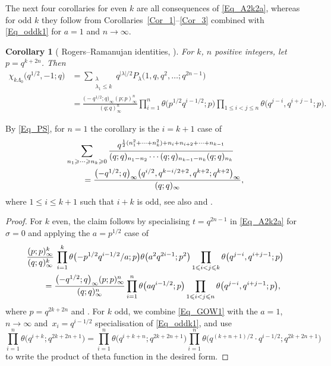\documentclass[pdftex]{sigma}
\numberwithin{equation}{section}
\newtheorem{Corollary}[Theorem]{Corollary}
\renewcommand{\leq}{\leqslant}
\renewcommand{\geq}{\geqslant}
\newcommand{\abs}[1]{\vert#1\vert}
\newcommand{\la}{\lambda}
\newcommand{\La}{\Lambda}
\begin{document}
The next four corollaries for even $k$ are all consequences of
\eqref{Eq_A2k2a}, whereas for odd $k$ they follow from
Corollaries~\ref{Cor_1}--\ref{Cor_3} combined with \eqref{Eq_oddk1}
for $a=1$ and $n\to\infty$.

\begin{Corollary}[ Rogers--Ramanujan identities,
{\cite[Theorem 5.14]{RW21}}]\label{Cor_4}
For $k$, $n$ positive integers, let $p=q^{k+2n}$.
Then
\begin{align*}
\chi_{k\La_0}\bigl(q^{1/2},-1;q\bigr)&=
\sum_{\substack{\la \\[1pt] \la_1\leq k}}
q^{\abs{\la}/2} P_{\la}\bigl(1,q,q^2,\dots;q^{2n-1}\bigr) \\
&=\frac{\bigl(-q^{1/2};q\bigr)_{\infty}(p;p)_{\infty}^n}{(q;q)_{\infty}^n}
\prod_{i=1}^n \theta\bigl(p^{1/2}q^{i-1/2};p\bigr)
\prod_{1\leq i<j\leq n} \theta\bigl(q^{j-i},q^{i+j-1};p\bigr).
\end{align*}
\end{Corollary}

By \eqref{Eq_PS}, for $n=1$ the corollary is the $i=k+1$ case of
\cite[Theorem 3]{Andrews10}
\begin{align}
&\sum_{n_1\geq\cdots\geq n_k\geq 0}
\frac{q^{\frac{1}{2}(n_1^2+\dots+n_k^2)+n_i+n_{i+2}+\dots+n_{k-1}}}
{(q;q)_{n_1-n_2}\cdots(q;q)_{n_{k-1}-n_k}(q;q)_{n_k}} \notag \\
&\qquad{}=\frac{\bigl(-q^{1/2};q\bigr)_{\infty}
\bigl(q^{i/2},q^{k-i/2+2},q^{k+2};q^{k+2}\bigr)_{\infty}}{(q;q)_{\infty}},
\label{Eq_Andrews10}
\end{align}
where $1\leq i\leq k+1$ such that $i+k$ is odd, see also
\cite[p.~449]{BIS00} and \cite[Theorem 4.4]{W03}.

\begin{proof}
For $k$ even, the claim follows by specialising $t=q^{2n-1}$ in
\eqref{Eq_A2k2a} for $\sigma=0$ and applying the $a=p^{1/2}$ case of
\begin{align}
&\frac{(p;p)_{\infty}^k}{(q;q)_{\infty}^k}\,
\prod_{i=1}^k \theta\bigl({-}p^{1/2}q^{i-1/2}/a;p\bigr)
\theta\bigl(a^2q^{2i-1};p^2\bigr)
\prod_{1\leq i<j\leq k} \theta\bigl(q^{j-i},q^{i+j-1};p\bigr) \notag \\
&\qquad=\frac{\bigl(-q^{1/2};q\bigr)_{\infty}(p;p)_{\infty}^n}{(q;q)_{\infty}^n}
\prod_{i=1}^n \theta\bigl(aq^{i-1/2};p\bigr)
\prod_{1\leq i<j\leq n} \theta\bigl(q^{j-i},q^{i+j-1};p\bigr),
\label{Eq_theta}
\end{align}
where $p=q^{2k+2n}$ and .
For $k$ odd, we combine \eqref{Eq_GOW1} with the $a=1$, $n\to\infty$
and~${x_i=q^{i-1/2}}$ specialisation of \eqref{Eq_oddk1}, and use
\[
\prod_{i=1}^n \theta\bigl(q^{i+k};q^{2k+2n+1}\bigr)=
\prod_{i=1}^n \theta\bigl(q^{i+k+n};q^{2k+2n+1}\bigr)
\prod_{i=1}^n \theta\bigl(q^{(k+n+1)/2}\cdot q^{i-1/2};q^{2k+2n+1}\bigr)
\]
to write the product of theta function in the desired form.
\end{proof}
\end{document}
